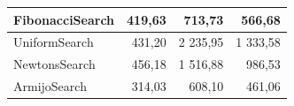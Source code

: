 \documentclass[a4paper,english,titlepage,12pt]{article}
\begin{document}
\begin{table}[H]
\begin{tabular}{|l|r|r|r|}
    FibonacciSearch                                                           & 419,63                                                    & \cellcolor[HTML]{C9E9D9}713,73                           & \cellcolor[HTML]{A5DABF}566,68                                \\ \hline
    UniformSearch                                                             & 431,20                                                    & \cellcolor[HTML]{E67B73}2 235,95                         & \cellcolor[HTML]{EDA19C}1 333,58                              \\ \hline
    NewtonsSearch                                                             & 456,18                                                    & \cellcolor[HTML]{EDA19C}1 516,88                         & \cellcolor[HTML]{F7D3D0}986,53                                \\ \hline
    ArmijoSearch                                                              & \cellcolor[HTML]{57BB89}314,03                            & \cellcolor[HTML]{57BB89}608,10                           & \cellcolor[HTML]{57BB89}461,06                                \\ \hline
    \end{tabular}
\end{table}
\end{document}
